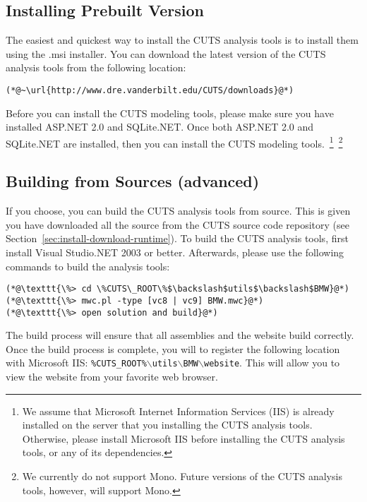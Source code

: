 \subsection{Installing Prebuilt Version}

The easiest and quickest way to install the CUTS analysis tools is to install
them using the .msi installer. You can download the latest version of the
CUTS analysis tools from the following location:
\begin{lstlisting}
(*@~\url{http://www.dre.vanderbilt.edu/CUTS/downloads}@*)
\end{lstlisting}
Before you can install the CUTS modeling tools, please make sure you have
installed ASP.NET 2.0 and SQLite.NET. Once both ASP.NET 2.0 and SQLite.NET are 
installed, then you can install the CUTS modeling tools.~\footnote{We assume that 
Microsoft Internet Information Services (IIS) is already installed on the server
that you installing the CUTS analysis tools. Otherwise, please install Microsoft
IIS before installing the CUTS analysis tools, or any of its dependencies.}~\footnote{We
currently do not support Mono. Future versions of the CUTS analysis tools, however, will
support Mono.}

\subsection{Building from Sources (advanced)}

If you choose, you can build the CUTS analysis tools from source. This is given 
you have downloaded all the source from the CUTS source code repository (see
Section~\ref{sec:install-download-runtime}). To build the CUTS analysis tools,
first install Visual Studio.NET 2003 or better. Afterwards, please use the following 
commands to build the analysis tools:
\begin{lstlisting}
(*@\texttt{\%> cd \%CUTS\_ROOT\%$\backslash$utils$\backslash$BMW}@*)
(*@\texttt{\%> mwc.pl -type [vc8 | vc9] BMW.mwc}@*)
(*@\texttt{\%> open solution and build}@*)
\end{lstlisting}
The build process will ensure that all assemblies and the website build correctly. 
Once the build process is complete, you will to register the following location
with Microsoft IIS: \texttt{\%CUTS\_ROOT\%$\backslash$utils$\backslash$BMW$\backslash$website}.
This will allow you to view the website from your favorite web browser.
